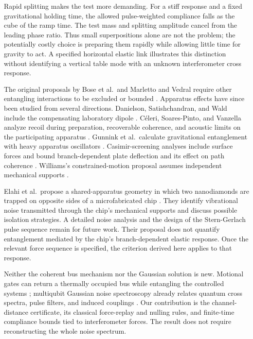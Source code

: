 \documentclass[aps,pra,reprint,amsmath,amssymb,longbibliography,floatfix]{revtex4-2}
\begin{document}
Rapid splitting makes the test more demanding. For a stiff response and a fixed gravitational holding time, the allowed pulse-weighted compliance falls as the cube of the ramp time. The test mass and splitting amplitude cancel from the leading phase ratio. Thus small superpositions alone are not the problem; the potentially costly choice is preparing them rapidly while allowing little time for gravity to act. A specified horizontal elastic link illustrates this distinction without identifying a vertical table mode with an unknown interferometer cross response.

The original proposals by Bose et al.\ and Marletto and Vedral require other entangling interactions to be excluded or bounded \cite{Bose,Marletto}. Apparatus effects have since been studied from several directions. Danielson, Satishchandran, and Wald include the compensating laboratory dipole \cite{Danielson}. C\'eleri, Soares-Pinto, and Vanzella analyze recoil during preparation, recoverable coherence, and acoustic limits on the participating apparatus \cite{Celeri}. Gunnink et al.\ calculate gravitational entanglement with heavy apparatus oscillators \cite{Gunnink}. Casimir-screening analyses include surface forces and bound branch-dependent plate deflection and its effect on path coherence \cite{Kamp,Schut}. Williams's constrained-motion proposal assumes independent mechanical supports \cite{Williams}.

Elahi et al.\ propose a shared-apparatus geometry in which two nanodiamonds are trapped on opposite sides of a microfabricated chip \cite{Elahi}. They identify vibrational noise transmitted through the chip's mechanical supports and discuss possible isolation strategies. A detailed noise analysis and the design of the Stern-Gerlach pulse sequence remain for future work. Their proposal does not quantify entanglement mediated by the chip's branch-dependent elastic response. Once the relevant force sequence is specified, the criterion derived here applies to that response.

Neither the coherent bus mechanism nor the Gaussian solution is new. Motional gates can return a thermally occupied bus while entangling the controlled systems \cite{Molmer}; multiqubit Gaussian noise spectroscopy already relates quantum cross spectra, pulse filters, and induced couplings \cite{PazSilva}. Our contribution is the channel-distance certificate, its classical force-replay and nulling rules, and finite-time compliance bounds tied to interferometer forces. The result does not require reconstructing the whole noise spectrum.
\end{document}
